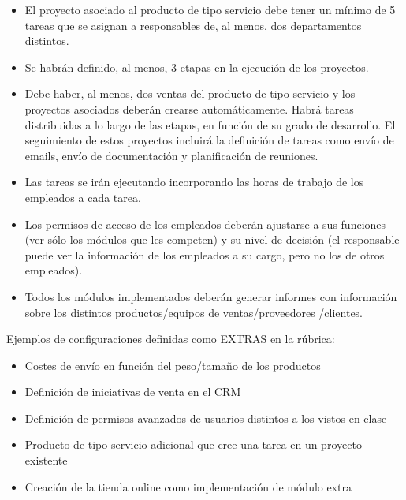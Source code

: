 \begin{itemize}
    \item El proyecto asociado al producto de tipo servicio debe tener un mínimo de 5 tareas que se asignan a responsables de, al menos, dos departamentos distintos.
    \item Se habrán definido, al menos, 3 etapas en la ejecución de los proyectos.
    \item Debe haber, al menos, dos ventas del producto de tipo servicio y los proyectos asociados deberán crearse automáticamente. Habrá tareas distribuidas a lo largo de las etapas, en función de su grado de desarrollo. El seguimiento de estos proyectos incluirá la definición de tareas como envío de emails, envío de documentación y planificación de reuniones.
    \item Las tareas se irán ejecutando incorporando las horas de trabajo de los empleados a cada tarea.
    \item Los permisos de acceso de los empleados deberán ajustarse a sus funciones (ver sólo los módulos que les competen) y su nivel de decisión (el responsable puede ver la información de los empleados a su cargo, pero no los de otros empleados).
    \item Todos los módulos implementados deberán generar informes con información sobre los distintos productos/equipos de ventas/proveedores /clientes.
\end{itemize}

Ejemplos de configuraciones definidas como EXTRAS en la rúbrica:
\begin{itemize}
    \item Costes de envío en función del peso/tamaño de los productos
    \item Definición de iniciativas de venta en el CRM
    \item Definición de permisos avanzados de usuarios distintos a los vistos en clase
    \item Producto de tipo servicio adicional que cree una tarea en un proyecto existente
    \item Creación de la tienda online como implementación de módulo extra
\end{itemize}